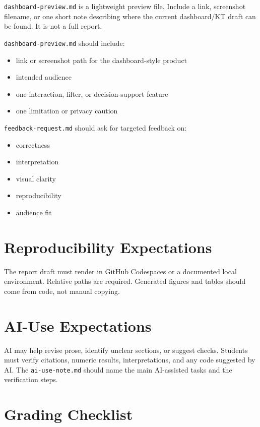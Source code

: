 \documentclass[
  letterpaper,
  DIV=11,
  numbers=noendperiod,
  oneside]{scrreprt}
\providecommand{\tightlist}{%
  \setlength{\itemsep}{0pt}\setlength{\parskip}{0pt}}
\begin{document}
\texttt{dashboard-preview.md} is a lightweight preview file. Include a
link, screenshot filename, or one short note describing where the
current dashboard/KT draft can be found. It is not a full report.

\texttt{dashboard-preview.md} should include:

\begin{itemize}
\tightlist
\item
  link or screenshot path for the dashboard-style product
\item
  intended audience
\item
  one interaction, filter, or decision-support feature
\item
  one limitation or privacy caution
\end{itemize}

\texttt{feedback-request.md} should ask for targeted feedback on:

\begin{itemize}
\tightlist
\item
  correctness
\item
  interpretation
\item
  visual clarity
\item
  reproducibility
\item
  audience fit
\end{itemize}

\section{Reproducibility
Expectations}\label{reproducibility-expectations-5}

The report draft must render in GitHub Codespaces or a documented local
environment. Relative paths are required. Generated figures and tables
should come from code, not manual copying.

\section{AI-Use Expectations}\label{ai-use-expectations-14}

AI may help revise prose, identify unclear sections, or suggest checks.
Students must verify citations, numeric results, interpretations, and
any code suggested by AI. The \texttt{ai-use-note.md} should name the
main AI-assisted tasks and the verification steps.

\section{Grading Checklist}\label{grading-checklist-13}
\end{document}

